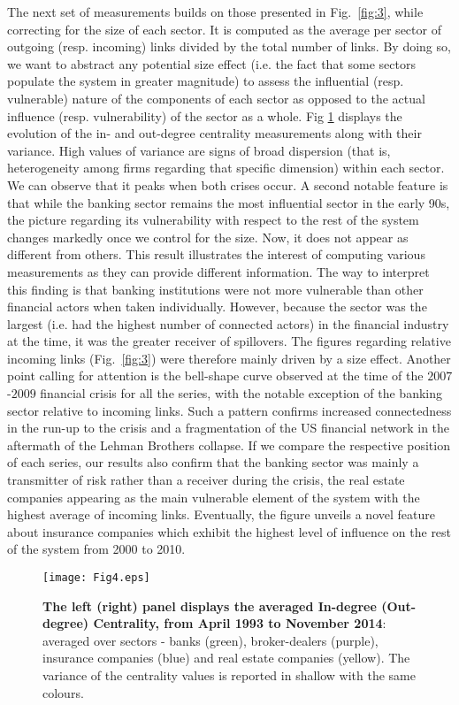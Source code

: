 \documentclass[a4paper,10pt]{article}
\begin{document}
The next set of measurements builds on those presented in Fig.~\ref{fig:3}, while correcting for the size of each sector. It 
is computed as the average per sector of outgoing (resp. incoming) links divided by the total number of links. By doing so,
we want to abstract any potential size effect (i.e. the fact that some sectors populate the system in greater magnitude)  to 
assess the influential (resp. vulnerable) nature of the components of each sector as opposed to the actual influence (resp. 
vulnerability) of the sector as a whole. Fig \ref{fig:4} displays the evolution of the in- and out-degree 
centrality   measurements along with their variance. High values of variance are signs of broad dispersion (that is, 
heterogeneity among firms regarding that specific dimension) within each sector. We can observe that it peaks when both crises
occur. A second notable feature is that while the banking sector remains the most influential sector in the early 90s, the 
picture regarding its vulnerability with respect to the rest of the system changes markedly once we control for the size. 
Now, it does not appear as different from others. This result illustrates the interest of computing various measurements as 
they can provide different information. The way to interpret this finding is that banking institutions were not  more 
vulnerable than  other financial actors when taken individually. However, because the sector was the largest (i.e. had the 
highest number of connected actors) in the financial industry at the time, it was the greater receiver of spillovers. The 
figures regarding relative incoming links (Fig.~\ref{fig:3}) were therefore mainly driven by a size effect. Another point 
calling for attention is the bell-shape curve observed at the time of the $2007$-$2009$ financial crisis for all the series, with 
the notable exception of the banking sector relative to incoming links. Such a pattern confirms increased connectedness in the
run-up to the crisis and a fragmentation of the US financial network in the aftermath of the Lehman Brothers collapse. If we
compare the respective position of each series, our results also confirm that the banking sector was mainly a transmitter of
risk rather than a receiver during the crisis, the real estate companies appearing as the main vulnerable element of the
system with the highest average of incoming links. Eventually, the figure unveils a novel feature about insurance companies
which exhibit the highest level of influence on the rest of the system from 2000 to 2010.
\begin{figure}[!h]
\texttt{[image: Fig4.eps]}
\caption{{\bf The left (right) panel displays the  averaged In-degree (Out-degree) Centrality, from April 1993 to November 2014}: 
averaged over sectors - banks (green), broker-dealers (purple), insurance companies (blue) and 
real estate companies (yellow).  The variance of the centrality values is reported in shallow with the same colours. 
}
\label{fig:4}
\end{figure}
\end{document}
